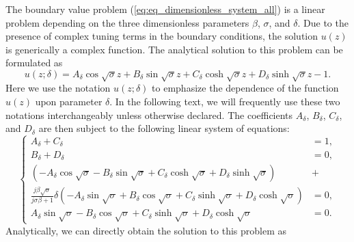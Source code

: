 \documentclass{svjour3}                     %
\begin{document}
The boundary value problem (\ref{eq:eq_dimensionless_system_all}) is a linear problem depending on the three dimensionless parameters $\beta$, $\sigma$, and $\delta$. Due to the presence of complex tuning terms in the boundary conditions, the solution $u(z)$ is generically a complex function. The analytical solution to this problem can be formulated as
\begin{equation}
    u(z;\delta) = A_\delta \cos{\sqrt{\sigma}z} + B_\delta \sin{\sqrt{\sigma}z} + C_\delta \cosh{\sqrt{\sigma}z} + D_\delta \sinh{\sqrt{\sigma}z} - 1.
    \label{eq:eq_disp_func_general_coeffs}
\end{equation}
Here we use the notation $u(z;\delta)$ to emphasize the dependence of the function $u(z)$ upon parameter $\delta$. In the following text, we will frequently use these two notations interchangeably unless otherwise declared. The coefficients $A_\delta$, $B_\delta$, $C_\delta$, and $D_\delta$ are then subject to the following linear system of equations:
\begin{equation}
    \left\{\begin{aligned}
        A_\delta + C_\delta &= 1, \\
        B_\delta + D_\delta &= 0, \\
        \left( - A_\delta \cos{\sqrt{\sigma}} - B_\delta \sin{\sqrt{\sigma}} + C_\delta \cosh{\sqrt{\sigma}} + D_\delta \sinh{\sqrt{\sigma}} \right) &+ \\
        \frac{j \beta \sqrt{\sigma}}{ j\sigma \beta + 1 } \delta \left( - A_\delta \sin{\sqrt{\sigma}} + B_\delta \cos{\sqrt{\sigma}} + C_\delta \sinh{\sqrt{\sigma}} + D_\delta \cosh{\sqrt{\sigma}} \right) &= 0, \\
        A_\delta \sin{\sqrt{\sigma}} - B_\delta \cos{\sqrt{\sigma}} + C_\delta \sinh{\sqrt{\sigma}} + D_\delta \cosh{\sqrt{\sigma}} &= 0.
    \end{aligned}\right.
\end{equation}
Analytically, we can directly obtain the solution to this problem as 
\end{document}
